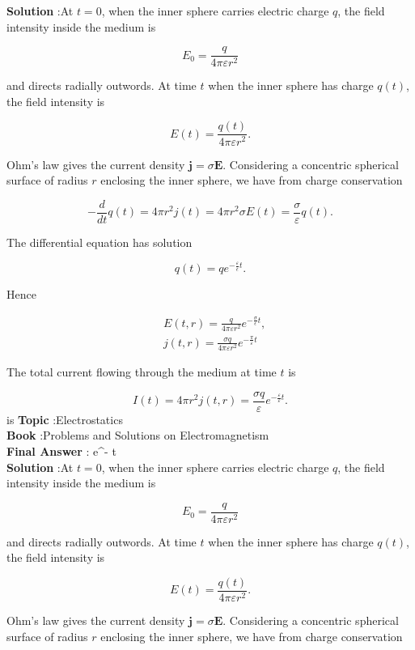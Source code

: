 \documentclass[10pt]{article}
\begin{document}
\textbf{Solution} :At $t=0$, when the inner sphere carries electric charge $q$, the field intensity inside the medium is

$$
E_{0}=\frac{q}{4 \pi \varepsilon r^{2}}
$$

and directs radially outwords. At time $t$ when the inner sphere has charge $q(t)$, the field intensity is

$$
E(t)=\frac{q(t)}{4 \pi \varepsilon r^{2}} .
$$

Ohm's law gives the current density $\mathbf{j}=\sigma \mathbf{E}$. Considering a concentric spherical surface of radius $r$ enclosing the inner sphere, we have from charge conservation

$$
-\frac{d}{d t} q(t)=4 \pi r^{2} j(t)=4 \pi r^{2} \sigma E(t)=\frac{\sigma}{\varepsilon} q(t) .
$$

The differential equation has solution

$$
q(t)=q e^{-\frac{\varepsilon}{\epsilon} t} .
$$

Hence

$$
\begin{aligned}
&E(t, r)=\frac{q}{4 \pi \varepsilon r^{2}} e^{-\frac{\sigma}{\epsilon} t}, \\
&j(t, r)=\frac{\sigma q}{4 \pi \varepsilon r^{2}} e^{-\frac{\pi}{\varepsilon} t}
\end{aligned}
$$

The total current flowing through the medium at time $t$ is

$$
I(t)=4 \pi r^{2} j(t, r)=\frac{\sigma q}{\varepsilon} e^{-\frac{\varepsilon}{\varepsilon} t} .
$$
is
\textbf{Topic} :Electrostatics\\
\textbf{Book} :Problems and Solutions on Electromagnetism\\
\textbf{Final Answer} : e^{-\frac{\varepsilon}{\varepsilon} t}\\


\textbf{Solution} :At $t=0$, when the inner sphere carries electric charge $q$, the field intensity inside the medium is

$$
E_{0}=\frac{q}{4 \pi \varepsilon r^{2}}
$$

and directs radially outwords. At time $t$ when the inner sphere has charge $q(t)$, the field intensity is

$$
E(t)=\frac{q(t)}{4 \pi \varepsilon r^{2}} .
$$

Ohm's law gives the current density $\mathbf{j}=\sigma \mathbf{E}$. Considering a concentric spherical surface of radius $r$ enclosing the inner sphere, we have from charge conservation
\end{document}
